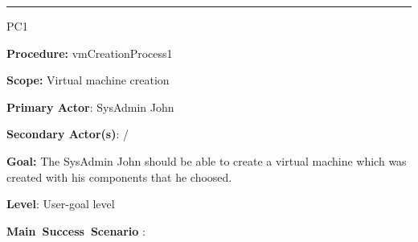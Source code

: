 \hrule
\vspace{0.5cm}
\begin{lyxlist}{PC1}
\small{
\item [\textbf{Procedure:}] vmCreationProcess1
\item [\textbf{Scope:}] Virtual machine creation
\item [\textbf{Primary Actor}:] SysAdmin John
\item [\textbf{Secondary Actor(s)}:] /
\item [\textbf{Goal:}] The SysAdmin John should be able to create a virtual
machine which was created with his components that he choosed.
\item [\textbf{Level}:] User-goal level
\item [\textbf{Main~Success~Scenario}]:\\

}
\end{lyxlist}
